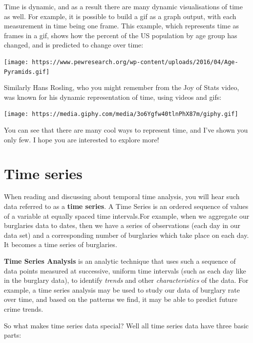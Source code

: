 \documentclass[
]{book}
\begin{document}
Time is dynamic, and as a result there are many dynamic visualisations of time as well. For example, it is possible to build a gif as a graph output, with each measurement in time being one frame. This example, which represents time as frames in a gif, shows how the percent of the US population by age group has changed, and is predicted to change over time:

\texttt{[image: https://www.pewresearch.org/wp-content/uploads/2016/04/Age-Pyramids.gif]}

Similarly Hans Rosling, who you might remember from the Joy of Stats video, was known for his dynamic representation of time, using videos and gifs:

\texttt{[image: https://media.giphy.com/media/3o6Ygfw40tlnPhX87m/giphy.gif]}

You can see that there are many cool ways to represent time, and I've shown you only few. I hope you are interested to explore more!

\hypertarget{time-series}{%
\section{Time series}\label{time-series}}

When reading and discussing about temporal time analysis, you will hear such data referred to as a \textbf{time series}. A Time Series is an ordered sequence of values of a variable at equally spaced time intervals.For example, when we aggregate our burglaries data to dates, then we have a series of observations (each day in our data set) and a corresponding number of burglaries which take place on each day. It becomes a time series of burglaries.

\textbf{Time Series Analysis} is an analytic technique that uses such a sequence of data points measured at successive, uniform time intervals (such as each day like in the burglary data), to identify \emph{trends} and other \emph{characteristics} of the data. For example, a time series analysis may be used to study our data of burglary rate over time, and based on the patterns we find, it may be able to predict future crime trends.

So what makes time series data special? Well all time series data have three basic parts:
\end{document}
